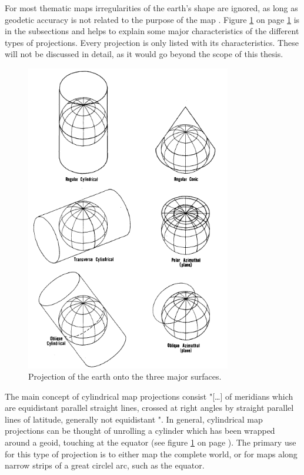 For most thematic maps irregularities of the earth's shape are ignored, as long as geodetic accuracy is not related to the purpose of the map . Figure \ref{fig:projections-base} on page \ref{fig:projections-base} is in the subsections and helps to explain some major characteristics of the different types of projections. Every projection is only listed with its characteristics. These will not be discussed in detail, as it would go beyond the scope of this thesis.

\begin{figure}[!htb]
\centering
\includegraphics[width=0.8\textwidth,keepaspectratio]{images/methods/mappings.png}
\caption[
    Projection of the earth onto the three major surfaces .
]{Projection of the earth onto the three major surfaces.}
\label{fig:projections-base}
\end{figure}

The main concept of cylindrical map projections consist "[\ldots] of meridians which are equidistant parallel straight lines, crossed at right angles by straight parallel lines of latitude, generally not equidistant ".
In general, cylindrical map projections can be thought of unrolling a cylinder which has been wrapped around a geoid, touching at the equator (see figure \ref{fig:projections-base} on page \pageref{fig:projections-base}).
The primary use for this type of projection is to either map the complete world, or for maps along narrow strips of a great circlel arc, such as the equator.

